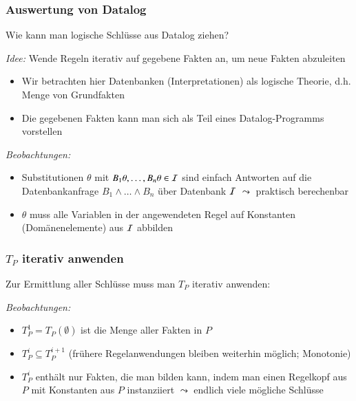 \documentclass[aspectratio=1610,onlymath]{beamer}
\begin{document}
\begin{frame}\frametitle{Auswertung von Datalog}

\alert{Wie kann man logische Schlüsse aus Datalog ziehen?}\medskip

\emph{Idee:} Wende Regeln iterativ auf gegebene Fakten an, um neue Fakten abzuleiten

\begin{itemize}
\item Wir betrachten hier Datenbanken (Interpretationen) als logische Theorie, d.h. Menge von Grundfakten
\item Die gegebenen Fakten kann man sich als Teil eines Datalog-Programms vorstellen
\end{itemize}\medskip\pause

\pause

\emph{Beobachtungen:}
\begin{itemize}
\item Substitutionen $\theta$ mit $B_1\theta,\ldots,B_n\theta\in\mathcal{I}$ sind einfach Antworten auf die Datenbankanfrage $B_1\wedge\ldots\wedge B_n$ über Datenbank $\mathcal{I}$ \alert{$\leadsto$ praktisch berechenbar}
\item $\theta$ muss alle Variablen in der angewendeten Regel auf Konstanten (Domänenelemente) aus $\mathcal{I}$ abbilden
\end{itemize}

\end{frame}

\begin{frame}\frametitle{$T_P$ iterativ anwenden}

Zur Ermittlung aller Schlüsse muss man $T_P$ iterativ anwenden:\medskip

\medskip\pause

\emph{Beobachtungen:} 
\begin{itemize}
\item $T_P^1=T_P(\emptyset)$ ist die Menge aller Fakten in $P$
\item $T_P^i\subseteq T_P^{i+1}$ (frühere Regelanwendungen bleiben weiterhin möglich; Monotonie)
\item $T_P^i$ enthält nur Fakten, die man bilden kann, indem man einen Regelkopf aus $P$ mit Konstanten aus $P$ instanziiert $\leadsto$ endlich viele mögliche Schlüsse
\end{itemize}
\medskip\pause


\end{frame}
\end{document}
